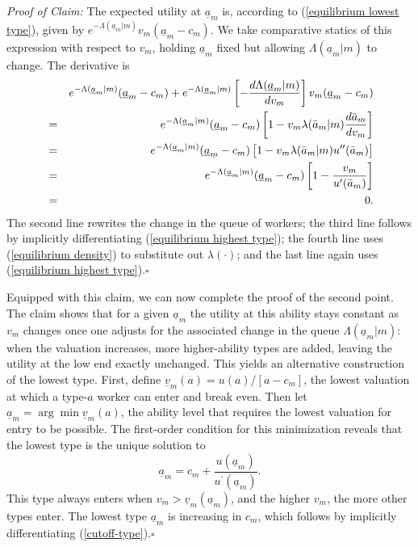 \documentclass[12pt]{article}
\begin{document}
\textit{Proof of Claim:} The expected utility at $\underline{a}_{m}$ is, according to (\ref{equilibrium lowest type}), given by $e^{-\Lambda(\underline{a}_{m}|m)}v_{m}(\underline{a}_{m}-c_{m})$. We take comparative statics of this expression with respect to $v_{m}$, holding $\underline{a}_{m}$ fixed but allowing $\Lambda(\underline{a}_{m}|m)$ to change. The derivative is
\begin{eqnarray*}
&&e^{-\Lambda (\underline{a}_{m}|m)}(\underline{a}_{m}-c_{m})+e^{-\Lambda (%
\underline{a}_{m}|m)}\left[ -\frac{d\Lambda (\underline{a}_{m}|m)}{dv_{m}}%
\right] v_{m}(\underline{a}_{m}-c_{m}) \\
&=&e^{-\Lambda (\underline{a}_{m}|m)}(\underline{a}_{m}-c_{m})\left[
1-v_{m}\lambda (\bar{a}_{m}|m)\frac{d\bar{a}_{m}}{dv_{m}}\right] \\
&=&e^{-\Lambda (\underline{a}_{m}|m)}(\underline{a}_{m}-c_{m})\left[
1-v_{m}\lambda (\bar{a}_{m}|m)u^{\prime \prime }(\bar{a}_{m})\right] \\
&=&e^{-\Lambda (\underline{a}_{m}|m)}(\underline{a}_{m}-c_{m})\left[ 1-\frac{%
v_{m}}{u^{\prime }(\bar{a}_{m})}\right] \\
&=&0.
\end{eqnarray*}
The second line rewrites the change in the queue of workers; the third line follows by implicitly differentiating (\ref{equilibrium highest type}); the fourth line uses (\ref{equilibrium density}) to substitute out $\lambda(\cdot)$; and the last line again uses (\ref{equilibrium highest type}).$\square$

\bigskip

Equipped with this claim, we can now complete the proof of the second point. The claim shows that for a given $\underline{a}_{m}$ the utility at this ability stays constant as $v_{m}$ changes once one adjusts for the associated change in the queue $\Lambda(\underline{a}_{m}|m)$: when the valuation increases, more higher-ability types are added, leaving the utility at the low end exactly unchanged. This yields an alternative construction of the lowest type. First, define $\underline{v}_{m}(a)=u(a)/[a-c_{m}]$, the lowest valuation at which a type-$a$ worker can enter and break even. Then let $\underline{a}_{m}=\arg\min \underline{v}_{m}(a)$, the ability level that requires the lowest valuation for entry to be possible. The first-order condition for this minimization reveals that the lowest type is the unique solution to
\begin{equation}\label{cutoff-type}
\underline{a}_{m}=c_{m}+\frac{u(\underline{a}_{m})}{u^{\prime}(\underline{a}_{m})}.
\end{equation}%
This type always enters when $v_{m}>\underline{v}_{m}(\underline{a}_{m})$, and the higher $v_{m}$, the more other types enter. The lowest type $\underline{a}_{m}$ is increasing in $c_{m}$, which follows by implicitly differentiating (\ref{cutoff-type}).$\square$
\end{document}
